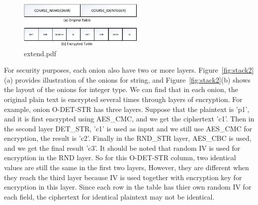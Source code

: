 

\begin{figure}[tb]
\centering
\includegraphics[width=6cm]{images/extend.pdf}
\caption{extend.pdf}
\label{fig:stackx}
\end{figure}

For security purposes, each onion also have two or more layers. Figure~\ref{fig:stack2}(a) provides illustration of the onions for string, and Figure~\ref{fig:stack2}(b) shows the layout of the onions for integer type. We can find that in each onion, the original plain text is encrypted several times through layers of encryption. For example, onion O-DET-STR has three layers. Suppose that the plaintext is 'p1', and it is first encrypted using AES\_CMC, and we get the ciphertext 'c1'. Then in the second layer DET\_STR, 'c1' is used as input and we still use AES\_CMC for encryption, the result is 'c2'. Finally in the RND\_STR layer, AES\_CBC is used, and we get the final result 'c3'. It should be noted that random IV is used for encryption in the RND layer. So for this O-DET-STR column, two identical values are still the same in the first two layers, However, they are different when they reach the third layer because IV is used together with encryption key for encryption in this layer. Since each row in the table has thier own random IV for each field, the ciphertext for identical plaintext may not be identical. 

